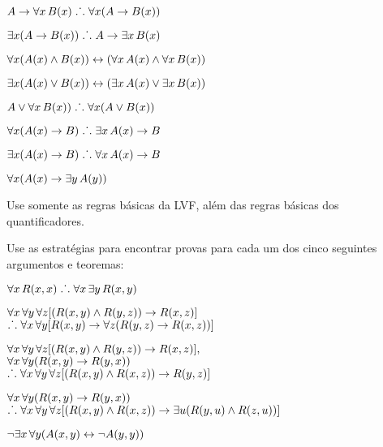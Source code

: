 \begin{earg}
\item $A \rightarrow \forall x\,\mathord{B}(x) \mathrel{\ldotp\dot{}\,\ldotp} \forall x(A \rightarrow \mathord{B}(x))$
\item $\exists x(A \rightarrow \mathord{B}(x)) \mathrel{\ldotp\dot{}\,\ldotp} A \rightarrow \exists x\, \mathord{B}(x)$
\item $\forall x(\mathord{A}(x) \wedge \mathord{B}(x)) \leftrightarrow (\forall x\,\mathord{A}(x) \wedge \forall x\,\mathord{B}(x))$
\item $\exists x(\mathord{A}(x) \vee \mathord{B}(x)) \leftrightarrow (\exists x\,\mathord{A}(x) \vee \exists x\,\mathord{B}(x))$
\item $A \vee \forall x\,\mathord{B}(x)) \mathrel{\ldotp\dot{}\,\ldotp} \forall x(A \vee \mathord{B}(x))$
\item $\forall x(\mathord{A}(x) \rightarrow B) \mathrel{\ldotp\dot{}\,\ldotp} \exists x\,\mathord{A}(x) \rightarrow B$
\item $\exists x(\mathord{A}(x) \rightarrow B) \mathrel{\ldotp\dot{}\,\ldotp} \forall x\,\mathord{A}(x) \rightarrow B$
\item $\forall x(\mathord{A}(x) \rightarrow \exists y\,\mathord{A}(y))$
\end{earg}
Use somente as regras básicas da LVF, além das regras básicas dos quantificadores.

\problempart
Use as estratégias para encontrar provas para cada um dos cinco seguintes argumentos e teoremas:
\begin{earg}
\item $\forall x\,\mathord{R}(x,x) \mathrel{\ldotp\dot{}\,\ldotp} \forall x\,\exists y\,\mathord{R}(x,y)$
\item $\forall x\,\forall y\,\forall z[(\mathord{R}(x,y) \wedge \mathord{R}(y,z)) \rightarrow \mathord{R}(x,z)]$ \\
$\mathrel{\ldotp\dot{}\,\ldotp} \forall x\,\forall y[\mathord{R}(x,y) \rightarrow \forall z(\mathord{R}(y,z) \rightarrow \mathord{R}(x,z))]$
\item $\forall x\,\forall y\,\forall z[(\mathord{R}(x,y) \wedge \mathord{R}(y,z)) \rightarrow \mathord{R}(x,z)],$\\ $\forall x\,\forall y(\mathord{R}(x,y) \rightarrow \mathord{R}(y, x))$ \\ $\mathrel{\ldotp\dot{}\,\ldotp} \forall x\,\forall y\,\forall z[(\mathord{R}(x,y) \wedge \mathord{R}(x,z)) \rightarrow \mathord{R}(y,z)]$
\item $\forall x\,\forall y(\mathord{R}(x,y) \rightarrow \mathord{R}(y, x))$ \\$\mathrel{\ldotp\dot{}\,\ldotp} \forall x\,\forall y\,\forall z[(\mathord{R}(x,y) \wedge \mathord{R}(x,z)) \rightarrow \exists u(\mathord{R}(y,u) \wedge \mathord{R}(z,u))]$
\item $\neg \exists x\,\forall y (\mathord{A}(x, y) \leftrightarrow \lnot\mathord{A}(y, y))$
\end{earg}

